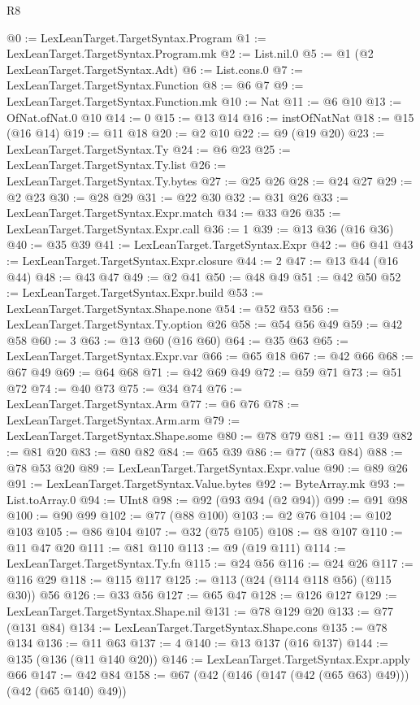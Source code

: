 \begin{lexlean}{R8}
\begin{coremodule}
@0 := LexLeanTarget.TargetSyntax.Program
@1 := LexLeanTarget.TargetSyntax.Program.mk
@2 := List.nil.{0}
@5 := @1 (@2 LexLeanTarget.TargetSyntax.Adt)
@6 := List.cons.{0}
@7 := LexLeanTarget.TargetSyntax.Function
@8 := @6 @7
@9 := LexLeanTarget.TargetSyntax.Function.mk
@10 := Nat
@11 := @6 @10
@13 := OfNat.ofNat.{0} @10
@14 := 0
@15 := @13 @14
@16 := instOfNatNat
@18 := @15 (@16 @14)
@19 := @11 @18
@20 := @2 @10
@22 := @9 (@19 @20)
@23 := LexLeanTarget.TargetSyntax.Ty
@24 := @6 @23
@25 := LexLeanTarget.TargetSyntax.Ty.list
@26 := LexLeanTarget.TargetSyntax.Ty.bytes
@27 := @25 @26
@28 := @24 @27
@29 := @2 @23
@30 := @28 @29
@31 := @22 @30
@32 := @31 @26
@33 := LexLeanTarget.TargetSyntax.Expr.match
@34 := @33 @26
@35 := LexLeanTarget.TargetSyntax.Expr.call
@36 := 1
@39 := @13 @36 (@16 @36)
@40 := @35 @39
@41 := LexLeanTarget.TargetSyntax.Expr
@42 := @6 @41
@43 := LexLeanTarget.TargetSyntax.Expr.closure
@44 := 2
@47 := @13 @44 (@16 @44)
@48 := @43 @47
@49 := @2 @41
@50 := @48 @49
@51 := @42 @50
@52 := LexLeanTarget.TargetSyntax.Expr.build
@53 := LexLeanTarget.TargetSyntax.Shape.none
@54 := @52 @53
@56 := LexLeanTarget.TargetSyntax.Ty.option @26
@58 := @54 @56 @49
@59 := @42 @58
@60 := 3
@63 := @13 @60 (@16 @60)
@64 := @35 @63
@65 := LexLeanTarget.TargetSyntax.Expr.var
@66 := @65 @18
@67 := @42 @66
@68 := @67 @49
@69 := @64 @68
@71 := @42 @69 @49
@72 := @59 @71
@73 := @51 @72
@74 := @40 @73
@75 := @34 @74
@76 := LexLeanTarget.TargetSyntax.Arm
@77 := @6 @76
@78 := LexLeanTarget.TargetSyntax.Arm.arm
@79 := LexLeanTarget.TargetSyntax.Shape.some
@80 := @78 @79
@81 := @11 @39
@82 := @81 @20
@83 := @80 @82
@84 := @65 @39
@86 := @77 (@83 @84)
@88 := @78 @53 @20
@89 := LexLeanTarget.TargetSyntax.Expr.value
@90 := @89 @26
@91 := LexLeanTarget.TargetSyntax.Value.bytes
@92 := ByteArray.mk
@93 := List.toArray.{0}
@94 := UInt8
@98 := @92 (@93 @94 (@2 @94))
@99 := @91 @98
@100 := @90 @99
@102 := @77 (@88 @100)
@103 := @2 @76
@104 := @102 @103
@105 := @86 @104
@107 := @32 (@75 @105)
@108 := @8 @107
@110 := @11 @47 @20
@111 := @81 @110
@113 := @9 (@19 @111)
@114 := LexLeanTarget.TargetSyntax.Ty.fn
@115 := @24 @56
@116 := @24 @26
@117 := @116 @29
@118 := @115 @117
@125 := @113 (@24 (@114 @118 @56) (@115 @30)) @56
@126 := @33 @56
@127 := @65 @47
@128 := @126 @127
@129 := LexLeanTarget.TargetSyntax.Shape.nil
@131 := @78 @129 @20
@133 := @77 (@131 @84)
@134 := LexLeanTarget.TargetSyntax.Shape.cons
@135 := @78 @134
@136 := @11 @63
@137 := 4
@140 := @13 @137 (@16 @137)
@144 := @135 (@136 (@11 @140 @20))
@146 := LexLeanTarget.TargetSyntax.Expr.apply @66
@147 := @42 @84
@158 := @67 (@42 (@146 (@147 (@42 (@65 @63) @49))) (@42 (@65 @140) @49))

\end{coremodule}
\end{lexlean}
